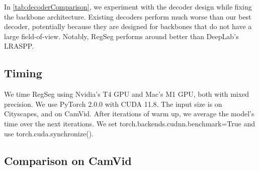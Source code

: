 \documentclass[10pt,twocolumn,letterpaper]{article}
\begin{document}
In \cref{tab:decoderComparison}, we experiment with the decoder design while fixing the backbone architecture. Existing decoders\cite{bisenetv1,sfnet,mobilenetv32019} perform much worse than our best decoder, potentially because they are designed for backbones that do not have a large field-of-view. Notably, RegSeg performs around  better than DeepLab's LRASPP.













\subsection{Timing}
\label{sec:timing}


We time RegSeg using Nvidia's T4 GPU and Mac's M1 GPU, both with mixed precision. We use PyTorch 2.0.0\cite{pytorch} with CUDA 11.8. The input size is  on Cityscapes, and  on CamVid. After  iterations of warm up, we average the model's time over the next  iterations. We set torch.backends.cudnn.benchmark=True and use torch.cuda.synchronize().

\subsection{Comparison on CamVid}
\end{document}
